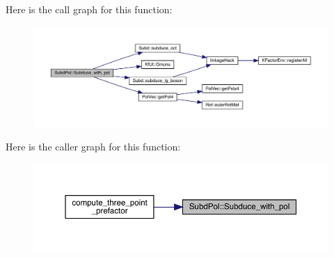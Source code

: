 Here is the call graph for this function\+:\nopagebreak
\begin{figure}[H]
\begin{center}
\leavevmode
\includegraphics[width=350pt]{db/d8a/namespaceSubdPol_a0c27e6a0353d158613d8d77e3c0ebbe7_cgraph}
\end{center}
\end{figure}
Here is the caller graph for this function\+:\nopagebreak
\begin{figure}[H]
\begin{center}
\leavevmode
\includegraphics[width=350pt]{db/d8a/namespaceSubdPol_a0c27e6a0353d158613d8d77e3c0ebbe7_icgraph}
\end{center}
\end{figure}
